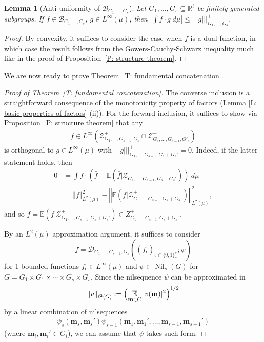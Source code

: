 \documentclass[11pt]{amsart}
\newtheorem{lemma}{Lemma}[section]
\theoremstyle{definition}
\DeclareMathOperator*{\oE}{\overline{\mathbb{E}}}
\newcommand{\R}{{\mathbb R}}
\newcommand{\CB}{{\mathcal B}}
\newcommand{\CD}{{\mathcal D}}
\newcommand{\CZ}{{\mathcal Z}}
\newcommand{\bm}{{\mathbf{m}}}
\newcommand{\ueps}{{\underline{\epsilon}}}
\newcommand{\norm}[1]{\left\Vert #1\right\Vert}
\newcommand{\nnorm}[1]{\lvert\!|\!| #1|\!|\!\rvert}
\newcommand{\1}{{\mathbf{1}}}
\DeclareMathOperator{\Nil}{Nil}
\newcommand{\abs}[1]{\mathopen{}\left| #1\mathclose{}\right|}
\newcommand{\Bigbrac}[1]{\Bigl( #1 \Bigr)}
\begin{document}
\begin{lemma}[Anti-uniformity of $\CB_{G_1, \ldots, G_s}$]\label{L: correlation with dual}
    Let $G_1, \ldots, G_s\subseteq\R^\ell$ be finitely generated subgroups. %
    If $f\in \CB_{G_1, \ldots, G_s}$, $g\in L^\infty(\mu)$, then $\abs{\int f\cdot g\; d\mu}\leq \nnorm{g}_{G_1, \ldots, G_s}^+$.
\end{lemma}
\begin{proof}
    By convexity, it suffices to consider the case when $f$ is a dual function, in which case the result follows from the Gowers-Cauchy-Schwarz inequality much like in the proof of Proposition~\ref{P: structure theorem}. 
\end{proof}
We are now ready to prove Theorem~\ref{T: fundamental concatenation}.
\begin{proof}[Proof of Theorem~\ref{T: fundamental concatenation}]
The converse inclusion is a straightforward consequence of the monotonicity property of factors (Lemma \ref{L: basic properties of factors} (ii)). For the forward inclusion, it suffices to show via Proposition~\ref{P: structure theorem} that any
\begin{align*}
    f\in L^\infty(\mathcal{Z}^+_{G_1,\dots,G_{s-1},G_s}\cap \mathcal{Z}^+_{G_1,\dots,G_{s-1},G'_s})
\end{align*}
is orthogonal to $g\in L^{\infty}(\mu)$ with $\nnorm{g}^+_{G_1,\dots, G_{s-1}, G_s+G_s'}=0$. Indeed, if the latter statement holds, then 
\begin{align*}
    0 &= \int f\cdot (\bar{f}-\mathbb{E}(\bar{f}\vert \CZ^+_{G_1,\dots, G_{s-1}, G_s+G_s'}))\ d\mu\\
    &= \norm{f}_{L^2(\mu)}^2 - \norm{\mathbb{E}(f\vert \CZ^+_{G_1,\dots, G_{s-1}, G_s+G_s'})}_{L^2(\mu)}^2,
\end{align*}
and so $f = \mathbb{E}(f\vert \CZ^+_{G_1,\dots, G_{s-1}, G_s+G_s'})\in Z^+_{G_1,\dots, G_{s-1}, G_s+G_s'}$. 

By an $L^2(\mu)$ approximation argument, it suffices to consider $$f = \CD_{G_1,\dots,G_{s-1},G_{s}}((f_{\ueps})_{\ueps\in\{0,1\}^{s}_{\ast}};\psi)$$ for 1-bounded functions $f_\ueps\in L^\infty(\mu)$ and %
$\psi\in\Nil_s(G)$ for $G = G_1\times G_1\times \cdots \times G_s\times G_s$. Since the nilsequence $\psi$ can be approximated in  $$\norm{v}_{\ell^2(G)}:=\Bigbrac{\oE_{\bm\in G}|v(\bm)|^2}^{1/2}$$ by a linear combination of nilsequences
\begin{align*}
  \psi_s(\bm_s,\bm_s') \psi_{s-1}(\bm_1, \bm_1', \ldots, \bm_{s-1},\bm_{s-1}')  
\end{align*}
(where $\bm_i,\bm_i'\in G_i$),
we can assume that $\psi$ takes such form.


\end{proof}
\end{document}
